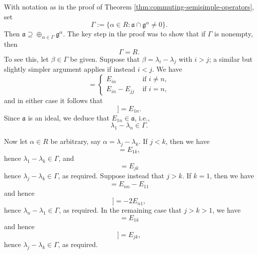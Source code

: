 \documentclass[reqno]{amsart} 
\begin{document}
With notation as in the proof of Theorem \ref{thm:commuting-semisimple-operators}, set 
\begin{equation*}
 \Gamma := \{\alpha \in R : \mathfrak{a} \cap \mathfrak{g}^\alpha \neq 0 \}.
\end{equation*}
Then $\mathfrak{a} \supseteq \oplus_{\alpha \in \Gamma} \mathfrak{g}^\alpha$.  The key step in the proof was to show that if $\Gamma$ is nonempty, then
\begin{equation}\label{eq:gamma-equals-R}
  \Gamma = R.
\end{equation}
To see this, let $\beta \in \Gamma$ be given.  Suppose that $\beta = \lambda_i - \lambda_j$ with $i > j$; a similar but slightly simpler argument applies if instead $i < j$.  We have
\begin{equation}
 [E_{i j}, E_{j n}]
  = 
\begin{cases}
    E_{i n} & \text{ if } i \neq n, \\
    E_{i n} - E_{j j} & \text{ if } i = n,
  \end{cases}
\end{equation}
and in either case it follows that
\begin{equation}
 [E_{1 i}, [E_{i j}, E_{j n}]]
  = E_{1 n}.
\end{equation}
Since $\mathfrak{a}$ is an ideal, we deduce that $E_{1 n} \in \mathfrak{a}$, i.e.,
\begin{equation}
  \lambda_1  - \lambda_n \in \Gamma.
\end{equation}

Now let $\alpha \in R$ be arbitrary, say $\alpha = \lambda_j - \lambda_k$.  If $j < k$, then we have
\begin{equation*}
 [E_{1 n}, E_{n k}] = E_{1 k},
\end{equation*}
hence $\lambda_1 - \lambda_k \in \Gamma$, and
\begin{equation*}
 [E_{j 1}, E_{1 k}]= E_{j k}
\end{equation*}
hence $\lambda_j - \lambda_k \in \Gamma$, as required.  Suppose instead that $j > k$.  If $k = 1$, then we have
\begin{equation*}
 [E_{n 1},E_{1 n}]
  = E_{n n} - E_{1 1}
\end{equation*}
and hence
\begin{equation*}
 [E_{n 1},[E_{n 1},E_{1 n}]]
  = - 2 E_{n 1},
\end{equation*}
hence $\lambda_n - \lambda_1 \in \Gamma$, as required.  In the remaining case that $j > k > 1$, we have
\begin{equation*}
 [E_{1 n}, E_{n k}]
  = E_{1 k}
\end{equation*}
and hence
\begin{equation*}
 [E_{j 1}, [E_{1 n}, E_{n k}]]
  = E_{j k},
\end{equation*}
hence $\lambda_j - \lambda_k \in \Gamma$, as required.
\end{document}

